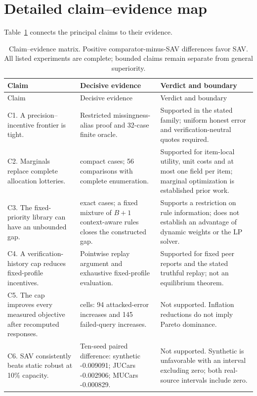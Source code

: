 \documentclass[11pt]{article}
\begin{document}
\section{Detailed claim--evidence map}\label{app:audit_map}
Table~\ref{tab:claims} connects the principal claims to their evidence.
\small
\begin{longtable}{>{\raggedright\arraybackslash}p{}>{\raggedright\arraybackslash}p{}>{\raggedright\arraybackslash}p{}}
\caption{Claim--evidence matrix. Positive comparator-minus-SAV differences
favor SAV. All listed experiments are complete; bounded claims remain separate from general superiority.}\label{tab:claims}\\
\toprule
Claim & Decisive evidence & Verdict and boundary\\
\midrule
\endfirsthead
\toprule Claim & Decisive evidence & Verdict and boundary\\\midrule
\endhead
C1. A precision--incentive frontier is tight. & Restricted missingness-alias proof and 32-case finite oracle. & Supported in the stated family; uniform honest error and verification-neutral quotes required.\\
\addlinespace
C2. Marginals replace complete allocation lotteries. & 57 compact cases; 56 comparisons with complete enumeration. & Supported for item-local utility, unit costs and at most one field per item; marginal optimization is established prior work.\\
\addlinespace
C3. The fixed-priority library can have an unbounded gap. & 26 exact cases; a fixed mixture of $B+1$ context-aware rules closes the constructed gap. & Supports a restriction on rule information; does not establish an advantage of dynamic weights or the LP solver.\\
\addlinespace
C4. A verification-history cap reduces fixed-profile incentives. & Pointwise replay argument and exhaustive fixed-profile evaluation. & Supported for fixed peer reports and the stated truthful replay; not an equilibrium theorem.\\
\addlinespace
C5. The cap improves every measured objective after recomputed responses. & 432 cells: 94 attacked-error increases and 145 failed-query increases. & Not supported. Inflation reductions do not imply Pareto dominance.\\
\addlinespace
C6. SAV consistently beats static robust at 10\% capacity. & Ten-seed paired difference: synthetic -0.009091; JUCars -0.002906; MUCars -0.000829. & Not supported. Synthetic is unfavorable with an interval excluding zero; both real-source intervals include zero.\\

\end{longtable}
\end{document}
